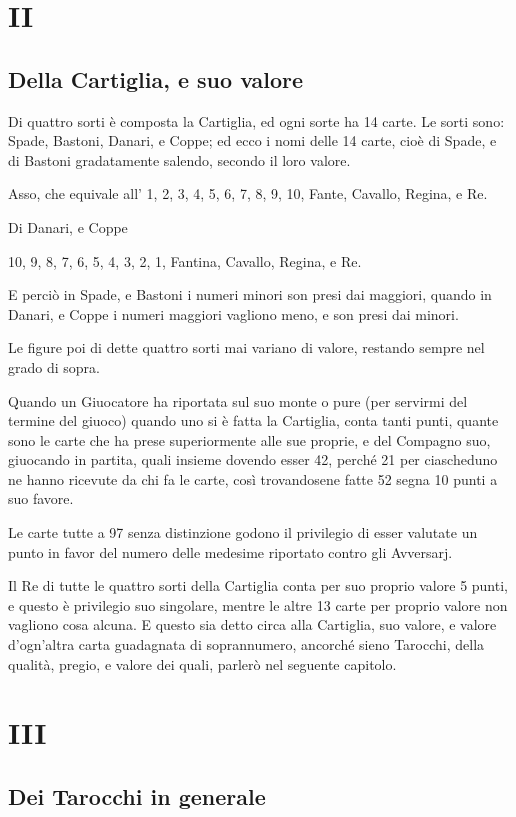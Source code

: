 \documentclass[11pt,a6paper]{article}
\begin{document}
\section{II}
\subsection*{Della Cartiglia, e suo valore}

Di quattro sorti è composta la Cartiglia, ed ogni sorte ha 14 carte. Le sorti sono: Spade, Bastoni, Danari, e Coppe; ed ecco i nomi delle 14 carte, cioè di Spade, e di Bastoni gradatamente salendo, secondo il loro valore.

Asso, che equivale all' 1, 2, 3, 4, 5, 6, 7, 8, 9, 10, Fante, Cavallo, Regina, e Re.

Di Danari, e Coppe

10, 9, 8, 7, 6, 5, 4, 3, 2, 1, Fantina, Cavallo, Regina, e Re.

E perciò in Spade, e Bastoni i numeri minori son presi dai maggiori, quando in Danari, e Coppe i numeri maggiori vagliono meno, e son presi dai minori.

Le figure poi di dette quattro sorti mai variano di valore, restando sempre nel grado di sopra.

Quando un Giuocatore ha riportata sul suo monte o pure (per servirmi del termine del giuoco) quando uno si è fatta la Cartiglia, conta tanti punti, quante sono le carte che ha prese superiormente alle sue proprie, e del Compagno suo, giuocando in partita, quali insieme dovendo esser 42, perché 21 per ciascheduno ne hanno ricevute da chi fa le carte, così trovandosene fatte 52 segna 10 punti a suo favore.

Le carte tutte a 97 senza distinzione godono il privilegio di esser valutate un punto in favor del numero delle medesime riportato contro gli Avversarj.

Il Re di tutte le quattro sorti della Cartiglia conta per suo proprio valore 5 punti, e questo è privilegio suo singolare, mentre le altre 13 carte per proprio valore non vagliono cosa alcuna. E questo sia detto circa alla Cartiglia, suo valore, e valore d'ogn'altra carta guadagnata di soprannumero, ancorché sieno Tarocchi, della qualità, pregio, e valore dei quali, parlerò nel seguente capitolo.

\section{III}
\subsection*{Dei Tarocchi in generale}
\end{document}
